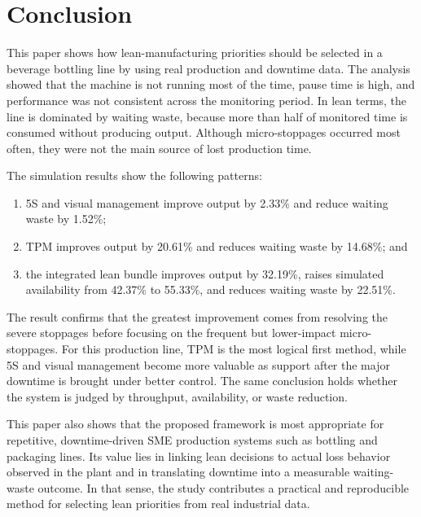 \documentclass[12pt,a4paper]{article}
\begin{document}
\section{Conclusion}
This paper shows how lean-manufacturing priorities should be selected in a beverage bottling line by using real production and downtime data. The analysis showed that the machine is not running most of the time, pause time is high, and performance was not consistent across the monitoring period. In lean terms, the line is dominated by waiting waste, because more than half of monitored time is consumed without producing output. Although micro-stoppages occurred most often, they were not the main source of lost production time.

The simulation results show the following patterns:
\begin{enumerate}
    \item 5S and visual management improve output by 2.33\% and reduce waiting waste by 1.52\%;
    \item TPM improves output by 20.61\% and reduces waiting waste by 14.68\%; and
    \item the integrated lean bundle improves output by 32.19\%, raises simulated availability from 42.37\% to 55.33\%, and reduces waiting waste by 22.51\%.
\end{enumerate}

The result confirms that the greatest improvement comes from resolving the severe stoppages before focusing on the frequent but lower-impact micro-stoppages. For this production line, TPM is the most logical first method, while 5S and visual management become more valuable as support after the major downtime is brought under better control. The same conclusion holds whether the system is judged by throughput, availability, or waste reduction.

This paper also shows that the proposed framework is most appropriate for repetitive, downtime-driven SME production systems such as bottling and packaging lines. Its value lies in linking lean decisions to actual loss behavior observed in the plant and in translating downtime into a measurable waiting-waste outcome. In that sense, the study contributes a practical and reproducible method for selecting lean priorities from real industrial data.
\end{document}
